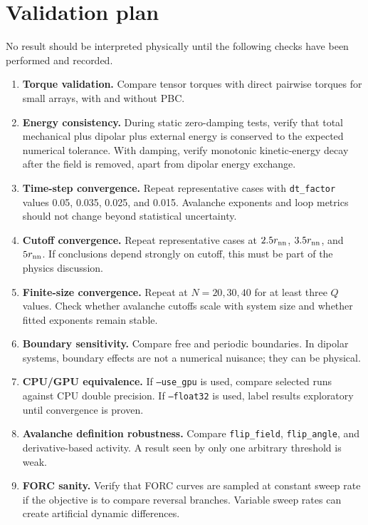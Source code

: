 \documentclass[11pt,a4paper]{article}
\newcommand{\code}[1]{\texttt{#1}}
\begin{document}
\section{Validation plan}
\label{sec:validation}

No result should be interpreted physically until the following checks have been performed and recorded.

\begin{enumerate}[leftmargin=*]
\item \textbf{Torque validation.} Compare tensor torques with direct pairwise torques for small arrays, with and without PBC.
\item \textbf{Energy consistency.} During static zero-damping tests, verify that total mechanical plus dipolar plus external energy is conserved to the expected numerical tolerance. With damping, verify monotonic kinetic-energy decay after the field is removed, apart from dipolar energy exchange.
\item \textbf{Time-step convergence.} Repeat representative cases with \code{dt\_factor} values 0.05, 0.035, 0.025, and 0.015. Avalanche exponents and loop metrics should not change beyond statistical uncertainty.
\item \textbf{Cutoff convergence.} Repeat representative cases at $2.5r_{\rm nn}$, $3.5r_{\rm nn}$, and $5r_{\rm nn}$. If conclusions depend strongly on cutoff, this must be part of the physics discussion.
\item \textbf{Finite-size convergence.} Repeat at $N=20,30,40$ for at least three $Q$ values. Check whether avalanche cutoffs scale with system size and whether fitted exponents remain stable.
\item \textbf{Boundary sensitivity.} Compare free and periodic boundaries. In dipolar systems, boundary effects are not a numerical nuisance; they can be physical.
\item \textbf{CPU/GPU equivalence.} If \code{--use\_gpu} is used, compare selected runs against CPU double precision. If \code{--float32} is used, label results exploratory until convergence is proven.
\item \textbf{Avalanche definition robustness.} Compare \code{flip\_field}, \code{flip\_angle}, and derivative-based activity. A result seen by only one arbitrary threshold is weak.
\item \textbf{FORC sanity.} Verify that FORC curves are sampled at constant sweep rate if the objective is to compare reversal branches. Variable sweep rates can create artificial dynamic differences.
\end{enumerate}
\end{document}
